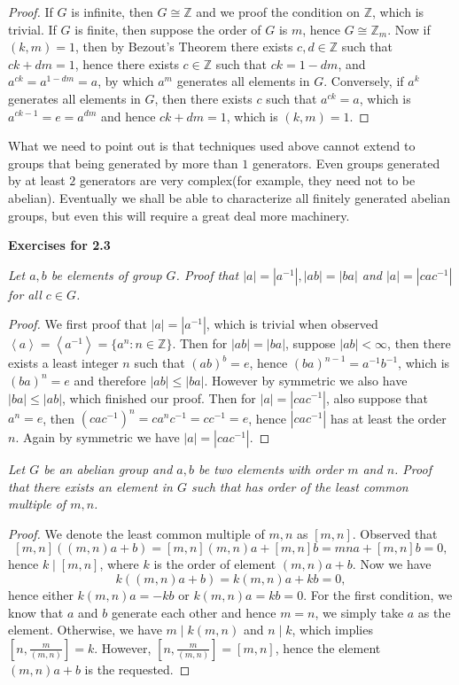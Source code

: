 \begin{proof}
If $G$ is infinite, then $G\cong\mathbb{Z}$ and we proof the condition on $\mathbb{Z}$, which is trivial. If $G$ is finite, then suppose the order of $G$ is $m$, hence $G\cong\mathbb{Z}_m$. Now if $(k,m)=1$, then by Bezout's Theorem there exists $c,d\in\mathbb{Z}$ such that $ck+dm=1$, hence there exists $c\in\mathbb{Z}$ such that $ck=1-dm$, and $a^{ck}=a^{1-dm}=a$, by which $a^m$ generates all elements in $G$. Conversely, if $a^k$ generates all elements in $G$, then there exists $c$ such that $a^{ck}=a$, which is $a^{ck-1}=e=a^{dm}$ and hence $ck+dm=1$, which is $(k,m)=1$.
\end{proof}
What we need to point out is that techniques used above cannot extend to groups that being generated by more than $1$ generators. Even groups generated by at least $2$ generators are very complex(for example, they need not to be abelian). Eventually we shall be able to characterize all finitely generated abelian groups, but even this will require a great deal more machinery. 
\begin{center}
\begin{large}
    \textbf{Exercises for 2.3}
\end{large}
\end{center}
\begin{problem}\em
Let $a,b$ be elements of group $G$. Proof that $|a|=|a^{-1}|,|ab|=|ba|$ and $|a|=|cac^{-1}|$ for all $c\in G$.
\end{problem}
\begin{proof}
We first proof that $|a|=|a^{-1}|$, which is trivial when observed $\left<a\right>=\left<a^{-1}\right>=\{a^n:n\in\mathbb{Z}\}$. Then for $|ab|=|ba
|$, suppose $|ab|<\infty$, then there exists a least integer $n$ such that $(ab)^b=e$, hence $(ba)^{n-1}=a^{-1}b^{-1}$, which is $(ba)^n=e$ and therefore $|ab|\le |ba|$. However by symmetric we also have $|ba|\le |ab|$, which finished our proof. Then for $|a|=|cac^{-1}|$, also suppose that $a^n=e$, then $(cac^{-1})^n=ca^nc^{-1}=cc^{-1}=e$, hence $|cac^{-1}|$ has at least the order $n$. Again by symmetric we have $|a|=|cac^{-1}|$.
\end{proof}
\begin{problem}\em
Let $G$ be an abelian group and $a,b$ be two elements with order $m$ and $n$. Proof that there exists an element in $G$ such that has order of the least common multiple of $m,n$.
\end{problem}
\begin{proof}
We denote the least common multiple of $m,n$ as $[m,n]$. Observed that 
$$
\left[ m,n \right] \left( \left( m,n \right) a+b \right) =\left[ m,n \right] \left( m,n \right) a+\left[ m,n \right] b=mna+\left[ m,n \right] b=0,
$$
hence $k\mid[m,n]$, where $k$ is the order of element $(m,n)a+b$. Now we have 
$$k((m,n)a+b)=k(m,n)a+kb=0,$$
hence either $k(m,n)a=-kb$ or $k(m,n)a=kb=0$. For the first condition, we know that $a$ and $b$ generate each other and hence $m=n$, we simply take $a$ as the element. Otherwise, we have $m\mid k(m,n)$ and $n\mid k$, which implies $\left[n,\frac{m}{(m,n)}\right]=k$. However, $\left[n,\frac{m}{(m,n)}\right]=[m,n]$, hence the element $(m,n)a+b$ is the requested.
\end{proof}
